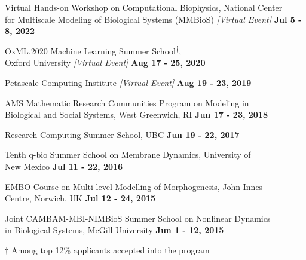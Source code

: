 \documentclass[margin,line]{res}
\newenvironment{list1}{
  \begin{list}{\ding{113}}{
      \setlength{\itemsep}{0in}
      \setlength{\parsep}{0in} \setlength{\parskip}{0in}
      \setlength{\topsep}{0in} \setlength{\partopsep}{0in}
      \setlength{\leftmargin}{0.17in}}}{\end{list}}
\begin{document}
\begin{resume}
\begin{list1}
\setlength\itemsep{0.5em}
\item[] Virtual Hands-on Workshop on Computational Biophysics, National Center \\ for Multiscale Modeling of Biological Systems (MMBioS) \textit{[Virtual Event]} \hfill {\bf Jul 5 - 8, 2022}
\item[] OxML.2020 Machine Learning Summer School\textsuperscript{$\dagger$}, \\ Oxford University \textit{[Virtual Event]} \hfill {\bf Aug 17 - 25, 2020}
\item[] Petascale Computing Institute \textit{[Virtual Event]} \hfill {\bf Aug 19 - 23, 2019}
\item[] AMS Mathematic Research Communities Program on Modeling in \\ Biological and Social Systems, West Greenwich, RI \hfill {\bf Jun 17 - 23, 2018}
\item[] Research Computing Summer School, UBC \hfill {\bf Jun 19 - 22, 2017}
\item[] Tenth q-bio Summer School on Membrane Dynamics, University of \\ New Mexico \hfill {\bf Jul 11 - 22, 2016}
\item[] EMBO Course on Multi-level Modelling of Morphogenesis, John Innes \\ Centre, Norwich, UK  \hfill {\bf Jul 12 - 24, 2015}
\item[] Joint CAMBAM-MBI-NIMBioS Summer School on Nonlinear Dynamics \\ in Biological Systems, McGill University \hfill {\bf Jun 1 - 12, 2015}
\item[] $\dagger$ Among top 12\% applicants accepted into the program
\end{list1}









\end{resume}
\end{document}

